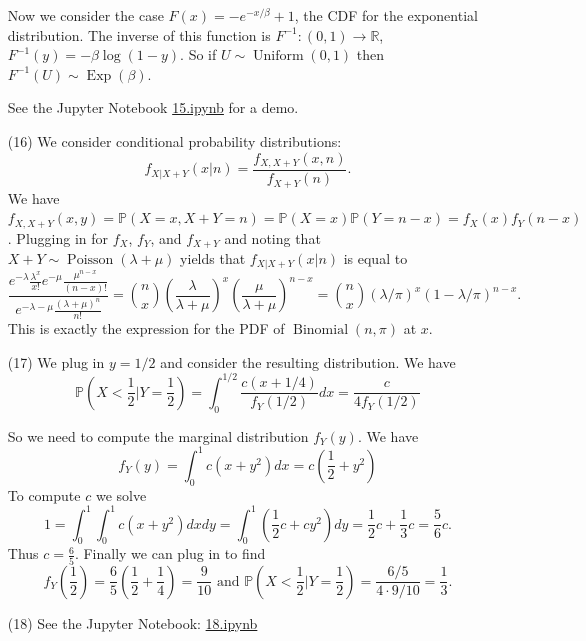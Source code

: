 \documentclass[10pt]{article}
\newcommand{\R}{\mathbb{R}}
\renewcommand{\P}{\mathbb{P}}
\newcommand{\Unif}{\operatorname{Uniform}}
\newcommand{\Binom}{\operatorname{Binomial}}
\newcommand{\Poiss}{\operatorname{Poisson}}
\newcommand{\Exp}{\operatorname{Exp}}
\begin{document}
\begin{enumerate}
Now we consider the case $F(x)=-e^{-x/\beta}+1$, the CDF for the exponential
distribution. The inverse of this function is $F^{-1}:(0,1)\to \R$,
$F^{-1}(y) = -\beta \log(1-y)$. So if $U\sim \Unif(0,1)$ then
$F^{-1}(U)\sim \Exp(\beta)$.

See the Jupyter Notebook
\href{https://github.com/ajrasmus/some_of_statistics/blob/main/chapter_2/13.ipynb}{15.ipynb}
for a demo.

\item[(16)]
We consider conditional probability distributions:
\[
f_{X|X+Y}(x|n) = \frac{f_{X,X+Y}(x,n)}{f_{X+Y}(n)}.
\]
We have $f_{X,X+Y}(x,y) = \P(X=x, X+Y=n) = \P(X=x) \P(Y = n-x)=f_X(x)f_Y(n-x)$.
Plugging in for $f_X$, $f_Y$, and $f_{X+Y}$ and noting that
$X+Y\sim \Poiss(\lambda+\mu)$ yields that $f_{X|X+Y}(x|n)$ is equal to
\[
\frac{e^{-\lambda}\frac{\lambda^x}{x!}e^{-\mu}\frac{\mu^{n-x}}{(n-x)!}}
{e^{-\lambda-\mu}\frac{(\lambda+\mu)^n}{n!}}
=
\binom{n}{x} \left(\frac{\lambda}{\lambda+\mu}\right)^x\left(\frac{\mu}{\lambda+\mu}\right)^{n-x}
= \binom{n}{x} (\lambda/\pi)^x (1-\lambda/\pi)^{n-x}.
\]
This is exactly the expression for the PDF of $\Binom(n,\pi)$ at $x$.

\item[(17)]
We plug in $y=1/2$ and consider the resulting distribution. We have
\[
\P\left(X<\frac{1}{2} | Y = \frac{1}{2}\right)
= \int_0^{1/2} \frac{c(x+1/4)}{f_Y(1/2)}dx
= \frac{c}{4f_Y(1/2)}
\]

So we need to compute the marginal distribution $f_Y(y)$. We have
\[
f_Y(y) = \int_0^1 c(x+y^2)dx = c\left(\frac{1}{2}+y^2\right)
\]
To compute $c$ we solve
\[
1 = \int_0^1 \int_0^1 c(x+y^2)dxdy = \int_0^1 \left(\frac{1}{2}c + cy^2\right)dy
= \frac{1}{2}c + \frac{1}{3}c = \frac{5}{6}c.
\]
Thus $c = \frac{6}{5}$. Finally we can plug in to find
\[
f_Y\left(\frac{1}{2}\right) = \frac{6}{5}\left(\frac{1}{2}+\frac{1}{4}\right)
= \frac{9}{10} \text{ and }
\P\left(X<\frac{1}{2} | Y = \frac{1}{2}\right) = \frac{6/5}{4 \cdot 9/10} =
\frac{1}{3}.
\]

\item[(18)]
See the Jupyter Notebook:
\href{https://github.com/ajrasmus/some_of_statistics/blob/main/chapter_2/18.ipynb}{18.ipynb}
\end{enumerate}
\end{document}
